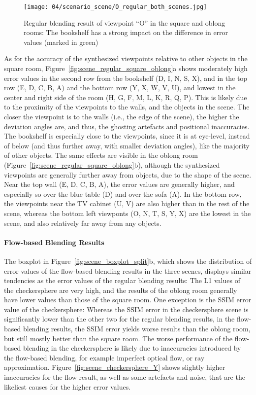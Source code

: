 \begin{figure}
		\centering
    \texttt{[image: 04/scenario\_scene/O\_regular\_both\_scenes.jpg]}
		\caption[Regular blending results of ``O'']{Regular blending result of viewpoint ``O'' in the square and oblong rooms: The bookshelf has a strong impact on the difference in error values (marked in green)}
		\label{fig:scene_O_regular}
\end{figure}

As for the accuracy of the synthesized viewpoints relative to other objects in the square room, Figure~\ref{fig:scene_regular_square_oblong}a shows 
moderately high error values in the second row from the bookshelf (D, I, N, S, X), and in the top row (E, D, C, B, A) and the bottom row (Y, X, W, V, U), and lowest in the center and right side of the room (H, G, F, M, L, K, R, Q, P). This is likely due to the proximity of the viewpoints to the walls, and the objects in the scene. The closer the viewpoint is to the walls (i.e., the edge of the scene), the higher the deviation angles are, and thus, the ghosting artefacts and positional inaccuracies. The bookshelf is especially close to the viewpoints, since it is at eye-level, instead of below (and thus further away, with smaller deviation angles), like the majority of other objects.
The same effects are visible in the oblong room (Figure~\ref{fig:scene_regular_square_oblong}b), although the synthesized viewpoints are generally further away from objects, due to the shape of the scene. Near the top wall (E, D, C, B, A), the error values are generally higher, and especially so over the blue table (D) and over the sofa (A). In the bottom row, the viewpoints near the TV cabinet (U, V) are also higher than in the rest of the scene, whereas the bottom left viewponts (O, N, T, S, Y, X) are the lowest in the scene, and also relatively far away from any objects.

\paragraph{Flow-based Blending Results}
The boxplot in Figure~\ref{fig:scene_boxplot_split}b, which shows the distribution of error values of the flow-based blending results in the three scenes, displays similar tendencies as the error values of the regular blending results: The L1 values of the checkersphere are very high, and the results of the oblong room generally have lower values than those of the square room. One exception is the SSIM error value of the checkersphere: Whereas the SSIM error in the checkersphere scene is significantly lower than the other two for the regular blending results, in the flow-based blending results, the SSIM error yields worse results than the oblong room, but still mostly better than the square room. The worse performance of the flow-based blending in the checkersphere is likely due to inaccuracies introduced by the flow-based blending, for example imperfect optical flow, or ray approximation. Figure~\ref{fig:scene_checkersphere_Y} shows slightly higher inaccuracies for the flow result, as well as some artefacts and noise, that are the likeliest causes for the higher error values.

